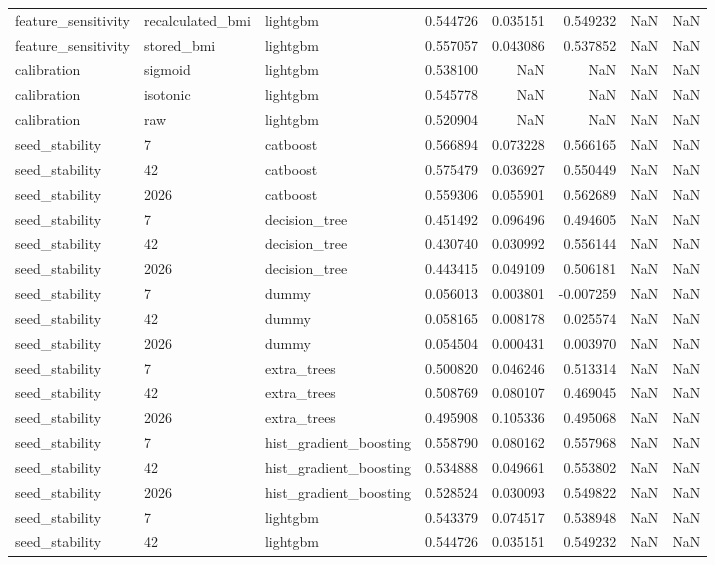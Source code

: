 \begin{tabular}{lllrrrrr}
feature\_sensitivity & recalculated\_bmi & lightgbm & 0.544726 & 0.035151 & 0.549232 & NaN & NaN \\
feature\_sensitivity & stored\_bmi & lightgbm & 0.557057 & 0.043086 & 0.537852 & NaN & NaN \\
calibration & sigmoid & lightgbm & 0.538100 & NaN & NaN & NaN & NaN \\
calibration & isotonic & lightgbm & 0.545778 & NaN & NaN & NaN & NaN \\
calibration & raw & lightgbm & 0.520904 & NaN & NaN & NaN & NaN \\
seed\_stability & 7 & catboost & 0.566894 & 0.073228 & 0.566165 & NaN & NaN \\
seed\_stability & 42 & catboost & 0.575479 & 0.036927 & 0.550449 & NaN & NaN \\
seed\_stability & 2026 & catboost & 0.559306 & 0.055901 & 0.562689 & NaN & NaN \\
seed\_stability & 7 & decision\_tree & 0.451492 & 0.096496 & 0.494605 & NaN & NaN \\
seed\_stability & 42 & decision\_tree & 0.430740 & 0.030992 & 0.556144 & NaN & NaN \\
seed\_stability & 2026 & decision\_tree & 0.443415 & 0.049109 & 0.506181 & NaN & NaN \\
seed\_stability & 7 & dummy & 0.056013 & 0.003801 & -0.007259 & NaN & NaN \\
seed\_stability & 42 & dummy & 0.058165 & 0.008178 & 0.025574 & NaN & NaN \\
seed\_stability & 2026 & dummy & 0.054504 & 0.000431 & 0.003970 & NaN & NaN \\
seed\_stability & 7 & extra\_trees & 0.500820 & 0.046246 & 0.513314 & NaN & NaN \\
seed\_stability & 42 & extra\_trees & 0.508769 & 0.080107 & 0.469045 & NaN & NaN \\
seed\_stability & 2026 & extra\_trees & 0.495908 & 0.105336 & 0.495068 & NaN & NaN \\
seed\_stability & 7 & hist\_gradient\_boosting & 0.558790 & 0.080162 & 0.557968 & NaN & NaN \\
seed\_stability & 42 & hist\_gradient\_boosting & 0.534888 & 0.049661 & 0.553802 & NaN & NaN \\
seed\_stability & 2026 & hist\_gradient\_boosting & 0.528524 & 0.030093 & 0.549822 & NaN & NaN \\
seed\_stability & 7 & lightgbm & 0.543379 & 0.074517 & 0.538948 & NaN & NaN \\
seed\_stability & 42 & lightgbm & 0.544726 & 0.035151 & 0.549232 & NaN & NaN \\

\end{tabular}
